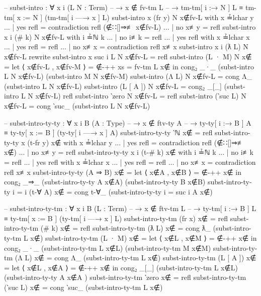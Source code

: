 \documentclass[logo,bsc,singlespacing,parskip,online]{infthesis}
\renewenvironment{code}{\mintedcopy[breaklines,breaksymbolleft=\;]{agda}}{\endmintedcopy}
\begin{document}
\begin{code}
  -- subst-intro : ∀ {x i} (L N : Term)
  --   → x ∉ fv-tm L
  --   → tm-tm[ i :→ N ] L ≡ tm-tm[ x := N ] (tm-tm[ i —→ x ] L)
  subst-intro {x} (fr y) N x∉fv-L with x ≟lchar y
  ... | yes refl = contradiction refl (∉∷[]⇒≢ x∉fv-L)
  ... | no  x≢y  = refl
  subst-intro {x} {i} (# k) N x∉fv-L with i ≟ℕ k
  ... | no  i≢k = refl
  ... | yes refl with x ≟lchar x
  ...   | yes refl = refl
  ...   | no  x≢x  = contradiction refl x≢x
  subst-intro {x} {i} (ƛ L) N x∉fv-L
    rewrite subst-intro {x} {suc i} L N x∉fv-L = refl
  subst-intro (L · M) N x∉ =
    let ⟨ x∉fv-L , x∉fv-M ⟩ = ∉-++ {xs = fv-tm L} x∉
    in cong₂ _·_ (subst-intro L N x∉fv-L) (subst-intro M N x∉fv-M)
  subst-intro (Λ L) N x∉fv-L = cong Λ_ (subst-intro L N x∉fv-L)
  subst-intro (L [ A ]) N x∉fv-L =
    cong₂ _[_] (subst-intro L N x∉fv-L) refl
  subst-intro ‵zero N x∉fv-L = refl
  subst-intro (‵suc L) N x∉fv-L =
    cong ‵suc_ (subst-intro L N x∉fv-L)

  -- subst-intro-ty-ty : ∀ {x i B} (A : Type)
  --   → x ∉ ftv-ty A
  --   → ty-ty[ i :→ B ] A ≡ ty-ty[ x := B ] (ty-ty[ i —→ x ] A)
  subst-intro-ty-ty ‵ℕ x∉ = refl
  subst-intro-ty-ty {x} (t-fr y) x∉ with x ≟lchar y
  ... | yes refl = contradiction refl (∉∷[]⇒≢ x∉)
  ... | no  x≢y  = refl
  subst-intro-ty-ty {x} {i} (t-# k) x∉ with i ≟ℕ k
  ... | no  i≢k  = refl
  ... | yes refl with x ≟lchar x
  ...   | yes refl = refl
  ...   | no  x≢x  = contradiction refl x≢x
  subst-intro-ty-ty (A ⇒ B) x∉ = let ⟨ x∉A , x∉B ⟩ = ∉-++ x∉
    in cong₂ _⇒_ (subst-intro-ty-ty A x∉A) (subst-intro-ty-ty B x∉B)
  subst-intro-ty-ty {i = i} (t-∀ A) x∉ = cong t-∀_ (subst-intro-ty-ty {i = suc i} A x∉)

  -- subst-intro-ty-tm : ∀ {x i B} (L : Term)
  --   → x ∉ ftv-tm L
  --   → ty-tm[ i :→ B ] L ≡ ty-tm[ x := B ] (ty-tm[ i —→ x ] L)
  subst-intro-ty-tm (fr x) x∉ = refl
  subst-intro-ty-tm (# k) x∉ = refl
  subst-intro-ty-tm (ƛ L) x∉ = cong ƛ_ (subst-intro-ty-tm L x∉)
  subst-intro-ty-tm (L · M) x∉ = let ⟨ x∉L , x∉M ⟩ = ∉-++ x∉
    in cong₂ _·_ (subst-intro-ty-tm L x∉L) (subst-intro-ty-tm M x∉M)
  subst-intro-ty-tm (Λ L) x∉ = cong Λ_ (subst-intro-ty-tm L x∉)
  subst-intro-ty-tm (L [ A ]) x∉ = let ⟨ x∉L , x∉A ⟩ = ∉-++ x∉
    in cong₂ _[_] (subst-intro-ty-tm L x∉L) (subst-intro-ty-ty A x∉A )
  subst-intro-ty-tm ‵zero x∉ = refl
  subst-intro-ty-tm (‵suc L) x∉ = cong ‵suc_ (subst-intro-ty-tm L x∉)
\end{code}
\end{document}

